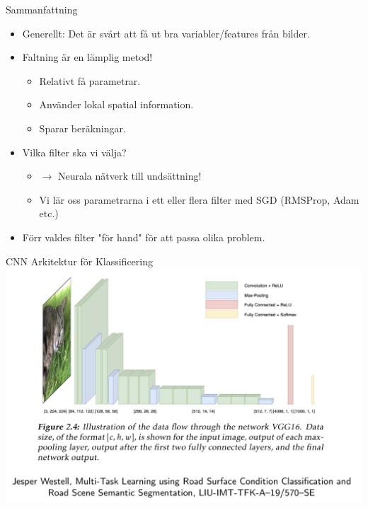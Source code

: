 \documentclass[10pt,english]{beamer}
\begin{document}
\begin{frame}{Sammanfattning}

    \begin{itemize}
        \item Generellt: Det är svårt att få ut bra variabler/features från bilder.
        \item Faltning är en lämplig metod!
        \begin{itemize}
            \item Relativt få parametrar.
            \item Använder lokal spatial information.
            \item Sparar beräkningar.
        \end{itemize}
        \item Vilka filter ska vi välja?
        \begin{itemize}
            \item $\rightarrow$ Neurala nätverk till undsättning!
            \item Vi lär oss parametrarna i ett eller flera filter med SGD (RMSProp, Adam etc.)
        \end{itemize}
        \item Förr valdes filter "för hand" för att passa olika problem.
    \end{itemize}
    
\end{frame}

\begin{frame}{CNN Arkitektur för Klassificering}
    \includegraphics[width = \textwidth]{figs/CNN ARCHITECTURE.png}
\end{frame}
\end{document}
